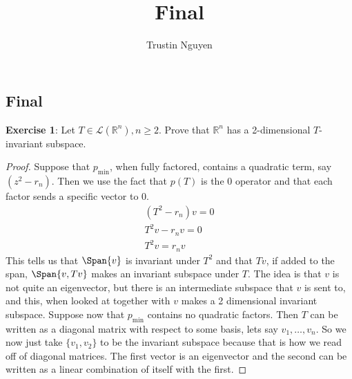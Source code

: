 \documentclass{article}
\title{Final}
\author{Trustin Nguyen}
\begin{document}
\maketitle
\reversemarginpar

\begin{topic}
	\section*{Final}
\end{topic}

\textbf{Exercise 1}: Let $T \in \mathcal{L}(\mathbb{R}^{n}), n \geq 2$. Prove that $\mathbb{R}^{n}$ has a 2-dimensional $T$-invariant subspace. 
\begin{proof}
	Suppose that $p_{\text{min}}$, when fully factored, contains a quadratic term, say $(z^{2} - r_{n})$. Then we use the fact that $p(T)$ is the 0 operator and that each factor sends a specific vector to 0. 
	\begin{align*}
		(T^{2} - r_{n})v = 0 \\
		T^{2}v - r_{n}v = 0 \\
		T^{2}v = r_{n}v
	\end{align*}
	This tells us that $\Span\{v\}$ is invariant under $T^{2}$ and that $Tv$, if added to the span, $\Span\{v, Tv\}$ makes an invariant subspace under $T$. The idea is that $v$ is not quite an eigenvector, but there is an intermediate subspace that $v$ is sent to, and this, when looked at together with $v$ makes a 2 dimensional invariant subspace. Suppose now that $p_{\text{min}}$ contains no quadratic factors. Then $T$ can be written as a diagonal matrix with respect to some basis, lets say $v_{1}, \ldots, v_{n}$. So we now just take $\{v_{1}, v_{2}\}$ to be the invariant subspace because that is how we read off of diagonal matrices. The first vector is an eigenvector and the second can be written as a linear combination of itself with the first. 
\end{proof}
\end{document}
